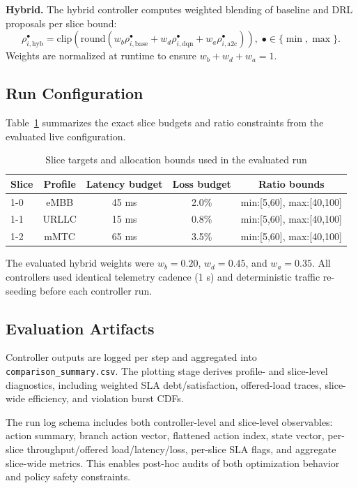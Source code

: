 \documentclass[journal]{IEEEtran}
\begin{document}
\textbf{Hybrid.} The hybrid controller computes weighted blending of baseline and DRL proposals per slice bound:
\begin{equation}
\rho^{\bullet}_{i,\mathrm{hyb}}=\mathrm{clip}\left(\mathrm{round}\left(w_b\rho^{\bullet}_{i,\mathrm{base}}+w_d\rho^{\bullet}_{i,\mathrm{dqn}}+w_a\rho^{\bullet}_{i,\mathrm{a2c}}\right)\right),\;
\bullet\in\{\min,\max\}.
\end{equation}
Weights are normalized at runtime to ensure \(w_b+w_d+w_a=1\).

\subsection{Run Configuration}
Table~\ref{tab:slice-config} summarizes the exact slice budgets and ratio constraints from the evaluated live configuration.

\begin{table}[t]
\caption{Slice targets and allocation bounds used in the evaluated run}
\label{tab:slice-config}
\centering
\begin{tabular}{lcccc}
\toprule
Slice & Profile & Latency budget & Loss budget & Ratio bounds \\
\midrule
1-0 & eMBB & 45 ms & 2.0\% & min:[5,60], max:[40,100] \\
1-1 & URLLC & 15 ms & 0.8\% & min:[5,60], max:[40,100] \\
1-2 & mMTC & 65 ms & 3.5\% & min:[5,60], max:[40,100] \\
\bottomrule
\end{tabular}
\end{table}

The evaluated hybrid weights were \(w_b=0.20\), \(w_d=0.45\), and \(w_a=0.35\). All controllers used identical telemetry cadence (1 s) and deterministic traffic re-seeding before each controller run.

\subsection{Evaluation Artifacts}
Controller outputs are logged per step and aggregated into \texttt{comparison\_summary.csv}. The plotting stage derives profile- and slice-level diagnostics, including weighted SLA debt/satisfaction, offered-load traces, slice-wide efficiency, and violation burst CDFs.

The run log schema includes both controller-level and slice-level observables: action summary, branch action vector, flattened action index, state vector, per-slice throughput/offered load/latency/loss, per-slice SLA flags, and aggregate slice-wide metrics. This enables post-hoc audits of both optimization behavior and policy safety constraints.
\end{document}
